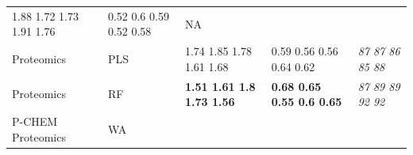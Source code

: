 \documentclass[utf8]{frontiersHLTH} %
\begin{document}
\begin{longtable}[]{@{}lllll@{}}
\begin{minipage}[t]{0.19\columnwidth}
1.88 1.72 1.73 1.91 1.76\strut
\end{minipage} & \begin{minipage}[t]{0.19\columnwidth}\raggedright\strut
0.52 0.6 0.59 0.52 0.58\strut
\end{minipage} & \begin{minipage}[t]{0.27\columnwidth}\raggedright\strut
NA\strut
\end{minipage}\tabularnewline
\begin{minipage}[t]{0.13\columnwidth}\raggedright\strut
Proteomics\strut
\end{minipage} & \begin{minipage}[t]{0.08\columnwidth}\raggedright\strut
PLS\strut
\end{minipage} & \begin{minipage}[t]{0.19\columnwidth}\raggedright\strut
1.74 1.85 1.78 1.61 1.68\strut
\end{minipage} & \begin{minipage}[t]{0.19\columnwidth}\raggedright\strut
0.59 0.56 0.56 0.64 0.62\strut
\end{minipage} & \begin{minipage}[t]{0.27\columnwidth}\raggedright\strut
\emph{87 87 86 85 88}\strut
\end{minipage}\tabularnewline
\begin{minipage}[t]{0.13\columnwidth}\raggedright\strut
Proteomics\strut
\end{minipage} & \begin{minipage}[t]{0.08\columnwidth}\raggedright\strut
RF\strut
\end{minipage} & \begin{minipage}[t]{0.19\columnwidth}\raggedright\strut
\textbf{1.51 1.61 1.8 1.73 1.56}\strut
\end{minipage} & \begin{minipage}[t]{0.19\columnwidth}\raggedright\strut
\textbf{0.68 0.65 0.55 0.6 0.65}\strut
\end{minipage} & \begin{minipage}[t]{0.27\columnwidth}\raggedright\strut
\emph{87 89 89 92 92}\strut
\end{minipage}\tabularnewline
\begin{minipage}[t]{0.13\columnwidth}\raggedright\strut
P-CHEM Proteomics\strut
\end{minipage} & \begin{minipage}[t]{0.08\columnwidth}\raggedright\strut
WA\strut
\end{minipage} & \begin{minipage}[t]{0.19\columnwidth}\raggedright\strut

\end{minipage}
\end{longtable}
\end{document}
